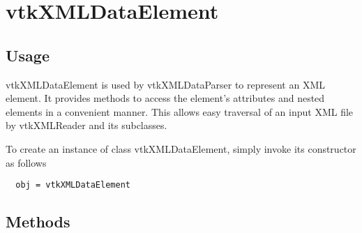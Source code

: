 \section{vtkXMLDataElement}

\subsection{Usage}

 vtkXMLDataElement is used by vtkXMLDataParser to represent an XML
 element.  It provides methods to access the element's attributes
 and nested elements in a convenient manner.  This allows easy
 traversal of an input XML file by vtkXMLReader and its subclasses.

To create an instance of class vtkXMLDataElement, simply
invoke its constructor as follows
\begin{verbatim}
  obj = vtkXMLDataElement
\end{verbatim}
\subsection{Methods}

